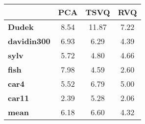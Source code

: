 \begin{tabular}{|l|c|c|c|}
\hline
&\textbf{PCA}&\textbf{TSVQ}&\textbf{RVQ}\\\hline
\textbf{Dudek}&8.54&11.87&7.22\\\hline
\textbf{davidin300}&6.93&6.29&4.39\\\hline
\textbf{sylv}&5.72&4.80&4.66\\\hline
\textbf{fish}&7.98&4.59&2.60\\\hline
\textbf{car4}&5.52&6.79&5.00\\\hline
\textbf{car11}&2.39&5.28&2.06\\\hline
\textbf{mean}&6.18&6.60&4.32\\\hline
\end{tabular}
